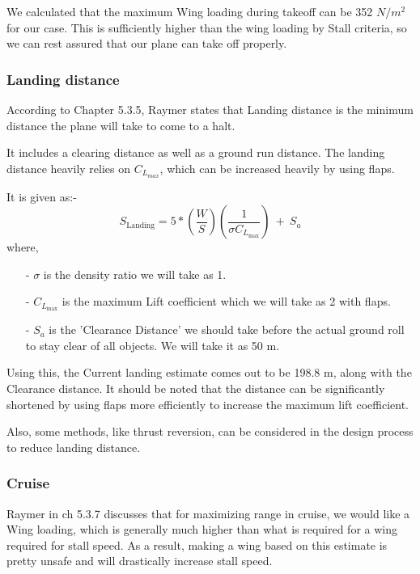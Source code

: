 \documentclass[12 pt]{article}
\begin{document}
We calculated that the maximum Wing loading during takeoff can be 352 $N/m^2$ for our case. This is sufficiently higher than the wing loading by Stall criteria, so we can rest assured that our plane can take off properly.

\subsubsection{Landing distance}

According to \cite{Raymer2006} Chapter 5.3.5, Raymer states that Landing distance is the minimum distance the plane will take to come to a halt.

It includes a clearing distance as well as a ground run distance. The landing distance heavily relies on $C_{L_{max}}$, which can be increased heavily by using flaps.

It is given as:- 
$$ S_{\text{Landing}} = 5*\left( \frac{W}{S} \right) \left( \frac{1}{\sigma C_{L_{\text{max}}}} \right) \: + \: S_a$$
where,
\begin{itemize}
    \item [-] $\sigma$ is the density ratio we will take as 1.
    \item[-] $C_{L_{\text{max}}} $ is the maximum Lift coefficient which we will take as 2 with flaps.
    \item[-] $S_a$ is the 'Clearance Distance' we should take before the actual ground roll to stay clear of all objects. We will take it as 50 m.
\end{itemize}

Using this, the Current landing estimate comes out to be 198.8 m, along with the Clearance distance. It should be noted that the distance can be significantly shortened by using flaps more efficiently to increase the maximum lift coefficient.

Also, some methods, like thrust reversion, can be considered in the design process to reduce landing distance.


\subsubsection{Cruise}

Raymer in \cite{Raymer2006} ch 5.3.7 discusses that for maximizing range in cruise, we would like a Wing loading, which is generally much higher than what is required for a wing required for stall speed. As a result, making a wing based on this estimate is pretty unsafe and will drastically increase stall speed.
\end{document}
